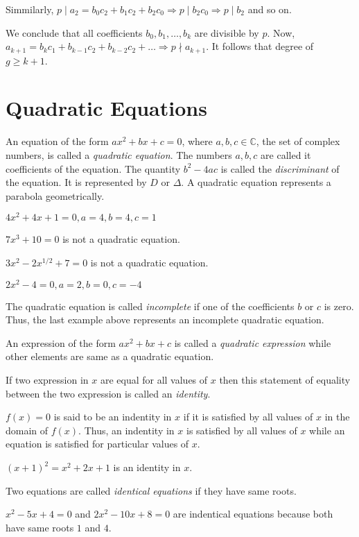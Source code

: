   Simmilarly, $p\mid a_2 = b_0c_2 + b_1c_2 + b_2c_0\Rightarrow p\mid b_2c_0\Rightarrow p\mid b_2$ and so on.

  We conclude that all coefficients $b_0, b_1, \ldots, b_k$ are divisible by $p$. Now, $a_{k + 1} = b_kc_1 +
  b_{k - 1}c_2 + b_{k - 2}c_2 + \ldots \Rightarrow p\nmid a_{k + 1}$. It follows that degree of $g\geq k  + 1$.
\stopproof
\section{Quadratic Equations}
An equation of the form $ax^2 + bx + c = 0$, where $a, b, c\in \mathbb{C}$, the set of complex numbers, is
called a {\it quadratic equation}. The numbers $a, b, c$ are called {it coefficients} of the equation. The
quantity $b^2 - 4ac$ is called the {\it discriminant} of the equation. It is represented by $D$ or
$\Delta$. A quadratic equation represents a parabola geometrically.

\startitemize[n]
\item $4x^2 + 4x + 1 = 0, a = 4, b = 4, c = 1$
\item $7x^3 + 10 = 0$ is not a quadratic equation.
\item $3x^2 -2x^{1/2} + 7 = 0$ is not a quadratic equation.
\item $2x^2 - 4 = 0, a = 2, b = 0, c= -4$
\stopitemize

The quadratic equation is called {\it incomplete} if one of the coefficients $b$ or $c$ is zero. Thus, the last example above
represents an incomplete quadratic equation.

An expression of the form $ax^2 + bx + c$ is called a {\it quadratic expression} while other elements are same as a quadratic
equation.

If two expression in $x$ are equal for all values of $x$ then this statement of equality between the two expression is called an
{\it identity}.

$f(x) = 0$ is said to be an indentity in $x$ if it is satisfied by all values of $x$ in the domain of $f(x)$. Thus, an indentity in
$x$ is satisfied by all values of $x$ while an equation is satisfied for particular values of $x$.

 $(x + 1)^2 = x^2 + 2x + 1$ is an identity in $x$.

Two equations are called {\it identical equations} if they have same roots.

 $x^2 - 5x + 4 = 0$ and $2x^2 - 10x + 8 = 0$ are indentical equations because both have same roots $1$ and $4$.

